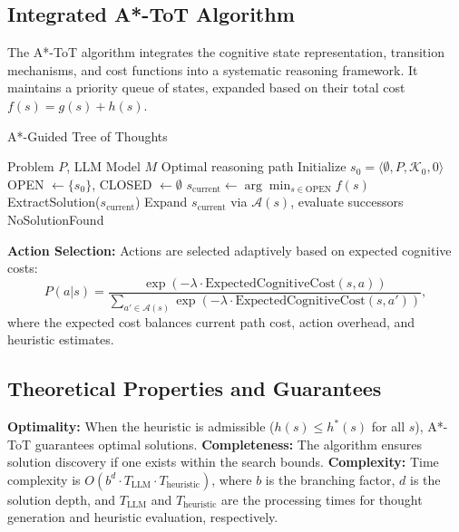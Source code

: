 \documentclass[12pt]{article}
\begin{document}
\subsection{Integrated A*-ToT Algorithm}
The A*-ToT algorithm integrates the cognitive state representation, transition mechanisms, and cost functions into a systematic reasoning framework. It maintains a priority queue of states, expanded based on their total cost $f(s) = g(s) + h(s)$.  \begin{algorithm}
\caption{A*-Guided Tree of Thoughts}
\begin{algorithmic}[1]
\REQUIRE Problem $P$, LLM Model $M$  
\ENSURE Optimal reasoning path  
\STATE Initialize $s_0 = \langle \emptyset, P, \mathcal{K}_0, 0 \rangle$  
\STATE OPEN $\leftarrow \{s_0\}$, CLOSED $\leftarrow \emptyset$  
    \STATE $s_{\text{current}} \leftarrow \arg\min_{s \in \text{OPEN}} f(s)$  
        \RETURN ExtractSolution($s_{\text{current}}$)  
    \ENDIF  
    \STATE Expand $s_{\text{current}}$ via $\mathcal{A}(s)$, evaluate successors  
\ENDWHILE  
\RETURN NoSolutionFound  
\end{algorithmic}
\end{algorithm}
\textbf{Action Selection:} Actions are selected adaptively based on expected cognitive costs:
\[
P(a|s) = \frac{\exp(-\lambda \cdot \text{ExpectedCognitiveCost}(s, a))}{\sum_{a' \in \mathcal{A}(s)} \exp(-\lambda \cdot \text{ExpectedCognitiveCost}(s, a'))},
\]
where the expected cost balances current path cost, action overhead, and heuristic estimates.
\subsection{Theoretical Properties and Guarantees}
\textbf{Optimality:} When the heuristic is admissible ($h(s) \leq h^*(s)$ for all $s$), A*-ToT guarantees optimal solutions.
\textbf{Completeness:} The algorithm ensures solution discovery if one exists within the search bounds.
\textbf{Complexity:} Time complexity is $O(b^d \cdot T_{\text{LLM}} \cdot T_{\text{heuristic}})$, where $b$ is the branching factor, $d$ is the solution depth, and $T_{\text{LLM}}$ and $T_{\text{heuristic}}$ are the processing times for thought generation and heuristic evaluation, respectively.
\end{document}
